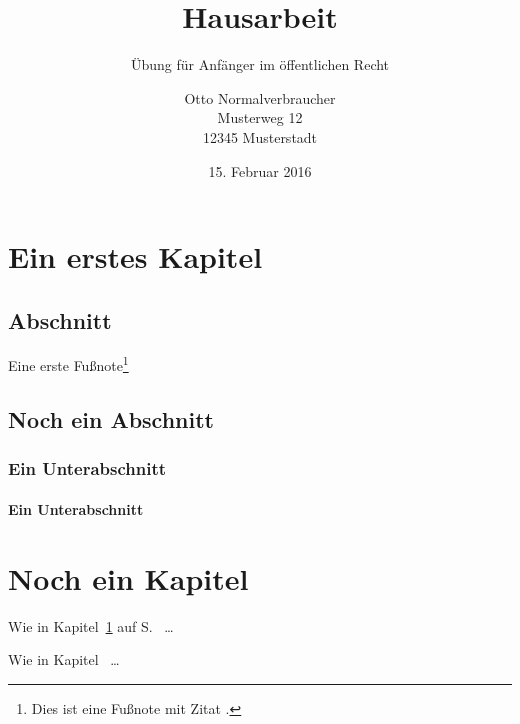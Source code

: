 \documentclass[headline]{hausarbeit-jura}
\begin{document}
\title{Hausarbeit}
\subtitle{Übung für Anfänger im öffentlichen Recht}
\author{Otto Normalverbraucher\\Musterweg 12\\12345 Musterstadt}
\date{15. Februar 2016}
\maketitle

\tableofcontents %

\chapter{Ein erstes Kapitel}\label{chap:ErstesKapitel}

\section{Abschnitt}
\blindtext[4]

Eine erste Fußnote\footnote{Dies ist eine Fußnote mit Zitat \cite[348, 349]{hau98}.}

\section{Noch ein Abschnitt}
\blindtext

\subsection{Ein Unterabschnitt}
\blindtext

\subsubsection{Ein Unterabschnitt}
\blindtext

\blindtext

\blindtext

\blindtext

\blindtext

\blindtext

\blindtext

\chapter{Noch ein Kapitel}
Wie in Kapitel~\ref{chap:ErstesKapitel} auf S.~\pageref{chap:ErstesKapitel} \ldots

Wie in Kapitel~ \ldots
\end{document}
